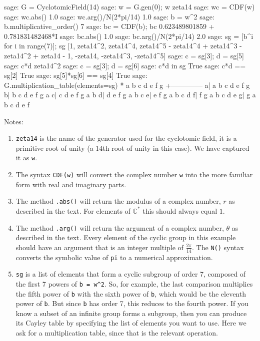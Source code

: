 %
\begin{sageexample}
sage: G = CyclotomicField(14)
sage: w = G.gen(0); w
zeta14
sage: wc = CDF(w)
sage: wc.abs()
1.0
sage: wc.arg()/N(2*pi/14)
1.0
sage: b = w^2
sage: b.multiplicative_order()
7
sage: bc = CDF(b); bc
0.623489801859 + 0.781831482468*I
sage: bc.abs()
1.0
sage: bc.arg()/N(2*pi/14)
2.0
sage: sg = [b^i for i in range(7)]; sg
[1, zeta14^2, zeta14^4,
zeta14^5 - zeta14^4 + zeta14^3 - zeta14^2 + zeta14 - 1,
-zeta14, -zeta14^3, -zeta14^5]
sage: c = sg[3]; d = sg[5]
sage: c*d
zeta14^2
sage: c = sg[3]; d = sg[6]
sage: c*d in sg
True
sage: c*d == sg[2]
True
sage: sg[5]*sg[6] == sg[4]
True
sage: G.multiplication_table(elements=sg)
*  a b c d e f g
 +--------------
a| a b c d e f g
b| b c d e f g a
c| c d e f g a b
d| d e f g a b c
e| e f g a b c d
f| f g a b c d e
g| g a b c d e f
\end{sageexample}
%
Notes:
\begin{enumerate}
%
\item \verb?zeta14? is the name of the generator used for the cyclotomic field, it is a primitive root of unity (a $14$th root of unity in this case).  We have captured it as \verb?w?.
%
\item The syntax \verb?CDF(w)? will convert the complex number \verb?w? into the more familiar form with real and imaginary parts.
%
\item The method \verb?.abs()? will return the modulus of a complex number, $r$ as described in the text.  For elements of ${\mathbb C}^\ast$ this should always equal $1$.
%
\item The method \verb?.arg()? will return the argument of a complex number, $\theta$ as described in the text.  Every element of the cyclic group in this example should have an argument that is an integer multiple of $\frac{2\pi}{14}$.  The \verb?N()? syntax converts the symbolic value of \verb?pi? to a numerical approximation.
%
\item \verb?sg? is a list of elements that form a cyclic subgroup of order 7, composed of the first 7 powers of \verb?b = w^2?.  So, for example, the last comparison multiplies the fifth power of \verb?b? with the sixth power of \verb?b?, which would be the eleventh power of \verb?b?.  But since \verb?b? has order 7, this reduces to the fourth power.
%
If you know a subset of an infinite group forms a subgroup, then you can produce its Cayley table by specifying the list of elements you want to use.  Here we ask for a multiplication table, since that is the relevant operation.
%
\end{enumerate}
%

